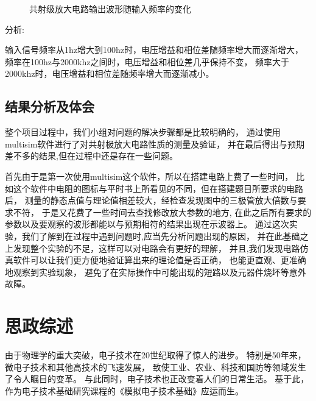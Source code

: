 \documentclass[10pt, conference, compsocconf, a4paper]{IEEEtran}
\begin{document}
\begin{figure}
   \label{1e}\hfill
    \label{1f}
  \caption{共射级放大电路输出波形随输入频率的变化}
  \label{fig1} 
\end{figure}


分析:\par
输入信号频率从1hz增大到100hz时，电压增益和相位差随频率增大而逐渐增大，
频率在100hz与2000khz之间时，电压增益和相位差几乎保持不变，
频率大于2000khz时，电压增益和相位差随频率增大而逐渐减小。

\subsection{结果分析及体会}
整个项目过程中，我们小组对问题的解决步骤都是比较明确的，
通过使用multisim软件进行了对共射极放大电路性质的测量及验证，
并在最后得出与预期差不多的结果,但在过程中还是存在一些问题。\par
首先由于是第一次使用multisim这个软件，所以在搭建电路上费了一些时间，
比如这个软件中电阻的图标与平时书上所看见的不同，但在搭建题目所要求的电路后，
测量的静态点值与理论值相差较大，经检查发现图中的三极管放大倍数与要求不符，
于是又花费了一些时间去查找修改放大参数的地方,
在此之后所有要求的参数以及要观察的波形都能以与预期相符的结果出现在示波器上。
通过这次实验，我们了解到在过程中遇到问题时,应当先分析问题出现的原因，
并在此基础之上发现整个实验的不足，这样可以对电路会有更好的理解，
并且,我们发现电路仿真软件可以让我们更方便地验证算出来的理论值是否正确，
也能更直观、更准确地观察到实验现象，
避免了在实际操作中可能出现的短路以及元器件烧坏等意外故障。

\section{思政综述}

由于物理学的重大突破，电子技术在20世纪取得了惊人的进步。
特别是50年来，微电子技术和其他高技术的飞速发展，
致使工业、农业、科技和国防等领域发生了令人瞩目的变革。
与此同时，电子技术也正改变着人们的日常生活。
基于此，作为电子技术基础研究课程的《模拟电子技术基础》应运而生。\cite{wang2009}
\par
\end{document}
